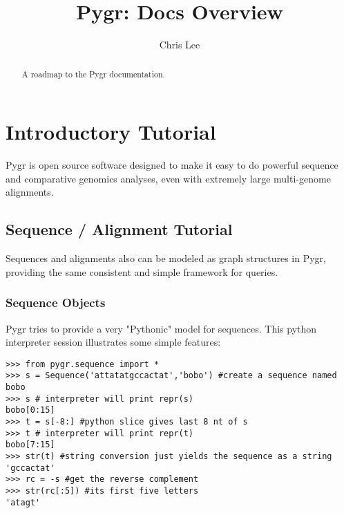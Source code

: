 \documentclass{howto}
\title{Pygr: Docs Overview}
\author{Chris Lee}
\begin{document}
\maketitle

\begin{abstract}
  \noindent
   A roadmap to the Pygr documentation.
\end{abstract}



%
\tableofcontents


\section{Introductory Tutorial}
\label{intro}

Pygr is open source software designed to make it easy to do powerful sequence and
comparative genomics analyses, even with extremely large multi-genome alignments.


\subsection{Sequence / Alignment Tutorial}
\label{seq-align}

Sequences and alignments also can be modeled as graph structures in Pygr, providing the same consistent and simple framework for queries.

\subsubsection{Sequence Objects}
Pygr tries to provide a very "Pythonic" model for sequences.  This python interpreter session illustrates some simple features:

\begin{verbatim}
>>> from pygr.sequence import *
>>> s = Sequence('attatatgccactat','bobo') #create a sequence named bobo
>>> s # interpreter will print repr(s)
bobo[0:15]
>>> t = s[-8:] #python slice gives last 8 nt of s
>>> t # interpreter will print repr(t)
bobo[7:15]
>>> str(t) #string conversion just yields the sequence as a string 
'gccactat'
>>> rc = -s #get the reverse complement
>>> str(rc[:5]) #its first five letters
'atagt'
\end{verbatim}
\end{document}

